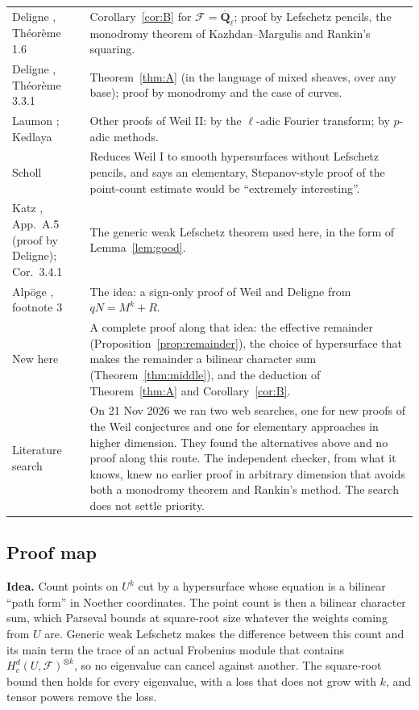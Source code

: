 \documentclass[11pt,a4paper]{article}
\theoremstyle{plain}
\theoremstyle{definition}
\theoremstyle{remark}
\newcommand{\Ql}{\overline{\mathbf Q}_\ell}
\newcommand{\F}{\mathcal F}
\begin{document}
\noindent
\begin{tabularx}{\textwidth}{@{}L{4.6cm}Y@{}}
\toprule
Deligne \cite{WeilI}, Th\'eor\`eme 1.6 & Corollary~\ref{cor:B} for $\F=\Ql$; proof by Lefschetz pencils, the monodromy theorem
of Kazhdan--Margulis and Rankin's squaring.\\
Deligne \cite{WeilII}, Th\'eor\`eme 3.3.1 & Theorem~\ref{thm:A} (in the language of mixed sheaves, over any base); proof by
monodromy and the case of curves.\\
Laumon \cite{Laumon}; Kedlaya \cite{Kedlaya} & Other proofs of Weil II: by the $\ell$-adic Fourier transform; by
$p$-adic methods.\\
Scholl \cite{Scholl} & Reduces Weil I to smooth hypersurfaces without Lefschetz pencils, and says an elementary,
Stepanov-style proof of the point-count estimate would be ``extremely interesting''.\\
Katz \cite{KatzACT}, App.~A.5 (proof by Deligne); Cor.~3.4.1 & The generic weak Lefschetz theorem used here, in the form
of Lemma~\ref{lem:good}.\\
Alp\"oge \cite{Alpoge}, footnote 3 & The idea: a sign-only proof of Weil and Deligne from $qN=M^k+R$.\\
\midrule
New here & A complete proof along that idea: the effective remainder (Proposition~\ref{prop:remainder}), the choice of
hypersurface that makes the remainder a bilinear character sum (Theorem~\ref{thm:middle}), and the deduction of
Theorem~\ref{thm:A} and Corollary~\ref{cor:B}.\\
Literature search & On 21 Nov 2026 we ran two web searches, one for new proofs of the Weil conjectures and one for
elementary approaches in higher dimension. They found the alternatives above and no proof along this route. The
independent checker, from what it knows, knew no earlier proof in arbitrary dimension that avoids both a monodromy
theorem and Rankin's method. The search does not settle priority.\\
\bottomrule
\end{tabularx}

\subsection{Proof map}

\textbf{Idea.} Count points on $U^k$ cut by a hypersurface whose equation is a bilinear ``path form'' in Noether
coordinates. The point count is then a bilinear character sum, which Parseval bounds at square-root size whatever the
weights coming from $U$ are. Generic weak Lefschetz makes the difference between this count and its main term the trace
of an actual Frobenius module that contains $H^d_c(U,\F)^{\otimes k}$, so no eigenvalue can cancel against another.
The square-root bound then holds for every eigenvalue, with a loss that does not grow with $k$, and tensor powers remove
the loss.
\end{document}
